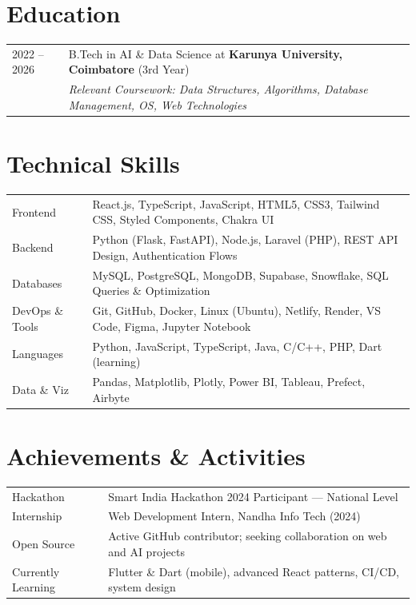 \documentclass[a4paper,12pt]{article}
\begin{document}
\section{Education}
\begin{tabularx}{\linewidth}{@{}l X@{}}
2022 -- 2026 & B.Tech in AI \& Data Science at \textbf{Karunya University, Coimbatore} \hfill \normalsize{(3rd Year)} \\
& \textit{Relevant Coursework: Data Structures, Algorithms, Database Management, OS, Web Technologies} \\
\end{tabularx}

\section{Technical Skills}
\begin{tabularx}{\linewidth}{@{}l X@{}}
Frontend         & \normalsize{React.js, TypeScript, JavaScript, HTML5, CSS3, Tailwind CSS, Styled Components, Chakra UI} \\
Backend          & \normalsize{Python (Flask, FastAPI), Node.js, Laravel (PHP), REST API Design, Authentication Flows} \\
Databases        & \normalsize{MySQL, PostgreSQL, MongoDB, Supabase, Snowflake, SQL Queries \& Optimization} \\
DevOps \& Tools  & \normalsize{Git, GitHub, Docker, Linux (Ubuntu), Netlify, Render, VS Code, Figma, Jupyter Notebook} \\
Languages        & \normalsize{Python, JavaScript, TypeScript, Java, C/C++, PHP, Dart (learning)} \\
Data \& Viz      & \normalsize{Pandas, Matplotlib, Plotly, Power BI, Tableau, Prefect, Airbyte} \\
\end{tabularx}

\section{Achievements \& Activities}
\begin{tabularx}{\linewidth}{@{}l X@{}}
Hackathon     & Smart India Hackathon 2024 Participant --- National Level \\
Internship    & Web Development Intern, Nandha Info Tech (2024) \\
Open Source   & Active GitHub contributor; seeking collaboration on web and AI projects \\
Currently Learning & Flutter \& Dart (mobile), advanced React patterns, CI/CD, system design \\
\end{tabularx}

\end{document}
